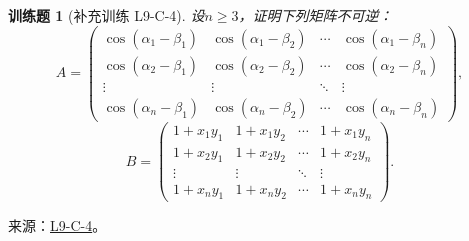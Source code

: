 \documentclass[UTF8,12pt,a4paper,fontset=fandol]{ctexart}
\newtheorem{exercise}{训练题}[section]
\begin{document}
\begin{exercise}[补充训练 L9-C-4]\label{prob:L9-C-4}
设$n\geqslant 3$，证明下列矩阵不可逆：
        \[A=\begin{pmatrix}
                \cos(\alpha_1-\beta_1) & \cos(\alpha_1-\beta_2) & \cdots & \cos(\alpha_1-\beta_n) \\
                \cos(\alpha_2-\beta_1) & \cos(\alpha_2-\beta_2) & \cdots & \cos(\alpha_2-\beta_n) \\
                \vdots                 & \vdots                 & \ddots & \vdots                 \\
                \cos(\alpha_n-\beta_1) & \cos(\alpha_n-\beta_2) & \cdots & \cos(\alpha_n-\beta_n)
            \end{pmatrix},\]
        \[B=\begin{pmatrix}
                1+x_1y_1 & 1+x_1y_2 & \cdots & 1+x_1y_n \\
                1+x_2y_1 & 1+x_2y_2 & \cdots & 1+x_2y_n \\
                \vdots   & \vdots   & \ddots & \vdots   \\
                1+x_ny_1 & 1+x_ny_2 & \cdots & 1+x_ny_n
            \end{pmatrix}.\]
\end{exercise}
\noindent 来源：\href{https://github.com/yhwu-is/Linear-Algebra-Left-Undone/blob/new/%E8%AE%B2%E4%B9%89/%E4%B8%93%E9%A2%98/9%20%E7%9F%A9%E9%98%B5%E8%BF%90%E7%AE%97%E8%BF%9B%E9%98%B6.tex}{L9-C-4}。
\end{document}
